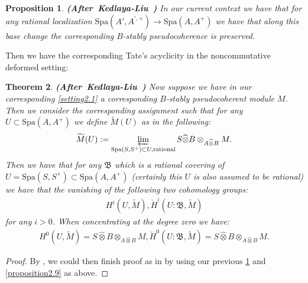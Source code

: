 \documentclass[12pt]{amsart}
\newtheorem{theorem}{Theorem}[section]
\newtheorem{proposition}[theorem]{Proposition}
\theoremstyle{definition}
\numberwithin{equation}{section}
\begin{document}
\begin{proposition} \mbox{\bf{(After Kedlaya-Liu \cite[Theorem 2.4.15]{KL2})}} \label{proposition2.10}
In our current context we have that for any rational localization $\mathrm{Spa}(A',A^{',+})\rightarrow \mathrm{Spa}(A,A^+)$ we have that along this base change the corresponding $B$-stably pseudocoherence is preserved.\\
	
\end{proposition}







\indent Then we have the corresponding Tate's acyclicity in the noncommutative deformed setting:

\begin{theorem}\mbox{\bf{(After Kedlaya-Liu \cite[Theorem 2.5.1]{KL2})}} \label{theorem2.11} Now suppose we have in our corresponding \cref{setting2.1} a corresponding $B$-stably pseudocoherent module $M$. Then we consider the corresponding assignment such that for any $U\subset \mathrm{Spa}(A,A^+)$ we define $\widetilde{M}(U)$ as in the following:
\begin{align}
\widetilde{M}(U):=\varprojlim_{\mathrm{Spa}(S,S^+)\subset U,\mathrm{rational}} S\widehat{\otimes}B\otimes_{A\widehat{\otimes}B}M.	
\end{align}
Then we have that for any $\mathfrak{B}$ which is a rational covering of $U=\mathrm{Spa}(S,S^+)\subset \mathrm{Spa}(A,A^+)$ (certainly this $U$ is also assumed to be rational) we have that the vanishing of the following two cohomology groups:
\begin{align}
H^i(U,\widetilde{M}), \check{H}^i(U:\mathfrak{B},\widetilde{M})
\end{align}
for any $i>0$. When concentrating at the degree zero we have:
\begin{align}
H^0(U,\widetilde{M})=S\widehat{\otimes}B\otimes_{A\widehat{\otimes}B}M, \check{H}^0(U:\mathfrak{B},\widetilde{M})=S\widehat{\otimes}B\otimes_{A\widehat{\otimes}B}M.
\end{align}
	
\end{theorem}
 	

\begin{proof}
By \cite[Propositions 2.4.20-2.4.21]{KL1}, we could then finish proof as in \cite[Theorem 2.5.1]{KL2} by using our previous \cref{proposition2.10} and \cref{proposition2.9} as above.	
\end{proof}
\end{document}
